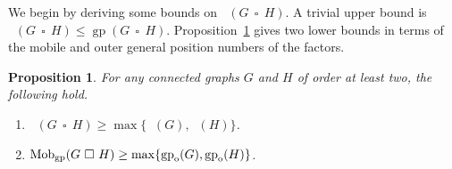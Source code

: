\documentclass[a4paper,12pt]{article}
\DeclareMathOperator{\mob}{Mob_{gp}}
\DeclareMathOperator{\gp}{gp}
\DeclareMathOperator{\cp}{\,\square\,}
\newcommand{\gpo}{\gp_{\rm o}}
\newtheorem{proposition}[theorem]{Proposition}
\theoremstyle{definition}
\begin{document}
	We begin by deriving some bounds on $\mob (G \cp H)$. A trivial upper bound is $\mob (G \cp H) \leq \gp (G \cp H)$. Proposition~\ref{prop:bounds-for-cp} gives two lower bounds in terms of the mobile and outer general position numbers of the factors.
	
	
	\begin{proposition}
		\label{prop:bounds-for-cp}
		For any connected graphs $G$ and $H$ of order at least two, the following hold. 
		\begin{enumerate}
			\item[(i)] $\mob(G\cp H) \ge \max\{\mob(G), \mob(H)\}$.
			\item[(ii)] $\mob (G \cp H) \geq \max \{ \gpo(G), \gpo(H)\}$. 
		\end{enumerate}
	\end{proposition}
	
\end{document}
